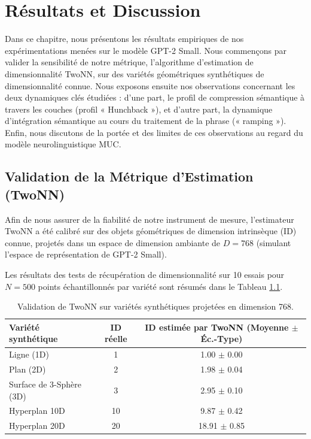 \chapter{Résultats et Discussion}
\label{chap:resultats}

Dans ce chapitre, nous présentons les résultats empiriques de nos expérimentations menées sur le modèle GPT-2 Small. Nous commençons par valider la sensibilité de notre métrique, l'algorithme d'estimation de dimensionnalité TwoNN, sur des variétés géométriques synthétiques de dimensionnalité connue. Nous exposons ensuite nos observations concernant les deux dynamiques clés étudiées : d'une part, le profil de compression sémantique à travers les couches (profil « Hunchback »), et d'autre part, la dynamique d'intégration sémantique au cours du traitement de la phrase (« ramping »). Enfin, nous discutons de la portée et des limites de ces observations au regard du modèle neurolinguistique MUC.

\section{Validation de la Métrique d'Estimation (TwoNN)}
Afin de nous assurer de la fiabilité de notre instrument de mesure, l'estimateur TwoNN a été calibré sur des objets géométriques de dimension intrinsèque (ID) connue, projetés dans un espace de dimension ambiante de $D = 768$ (simulant l'espace de représentation de GPT-2 Small). 

Les résultats des tests de récupération de dimensionnalité sur 10 essais pour $N = 500$ points échantillonnés par variété sont résumés dans le Tableau \ref{tab:validation_twonn}.

\begin{table}[H]
\centering
\begin{tabular}{|l|c|c|}
\hline
\textbf{Variété synthétique} & \textbf{ID réelle} & \textbf{ID estimée par TwoNN (Moyenne $\pm$ Éc.-Type)} \\ \hline
Ligne (1D)                   & 1                   & 1.00 $\pm$ 0.00 \\ \hline
Plan (2D)                    & 2                   & 1.98 $\pm$ 0.04 \\ \hline
Surface de 3-Sphère (3D)     & 3                   & 2.95 $\pm$ 0.10 \\ \hline
Hyperplan 10D                & 10                  & 9.87 $\pm$ 0.42 \\ \hline
Hyperplan 20D                & 20                  & 18.91 $\pm$ 0.85 \\ \hline
\end{tabular}
\caption{Validation de TwoNN sur variétés synthétiques projetées en dimension 768.}
\label{tab:validation_twonn}
\end{table}

